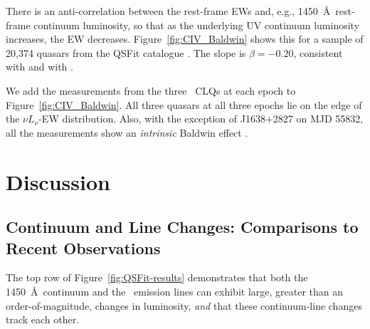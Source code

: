 \documentclass[fleqn,usenatbib]{mnras}
\begin{document}
There is an anti-correlation between the rest-frame EWs and, e.g.,
1450~\AA\ rest-frame continuum luminosity, so that as the underlying
UV continuum luminosity increases, the EW decreases.
Figure~\ref{fig:CIV_Baldwin} shows this for a sample of 20,374 quasars
from the QSFit catalogue \citep{Calderone2017}.  The slope is $\beta=
-0.20$, consistent with \citet[][ $\beta=-0.25$, but for bolometric
luminosity rather than rest-frame UV continuum luminosity]
{Kozlowski2017} and with \citet[][ $\beta=-0.23$]{Hamann2017}.

We add the measurements from the three \civ\ CLQs at each epoch
to Figure~\ref{fig:CIV_Baldwin}. All three quasars at all three epochs
lie on the edge of the $\nu L_{\nu}$-EW distribution.  Also, with the
exception of J1638+2827 on MJD 55832, all the measurements show an
{\it intrinsic} Baldwin effect \citep[e.g.,][]{Goad2004, Rakic2017}.




\section{Discussion}
\subsection{Continuum and Line Changes: Comparisons to Recent Observations}
The top row of Figure~\ref{fig:QSFit-results} demonstrates that both
the 1450~\AA\ continuum and the \civ\ emission lines can exhibit
large, greater than an order-of-magnitude, changes in luminosity, {\it
and} that these continuum-line changes track each other.
\end{document}
